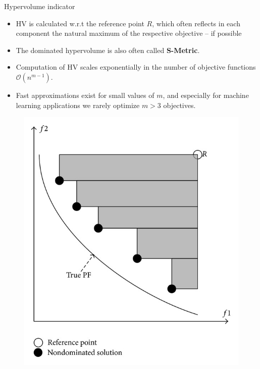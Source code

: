 \documentclass[11pt,compress,t,notes=noshow, xcolor=table]{beamer}
\begin{document}
\begin{vbframe}{Hypervolume indicator}
\vspace{0.4cm}
\begin{minipage}[t]{0.65\textwidth}
\footnotesize
\begin{itemize}
            \item HV is calculated w.r.t the reference point $R$, which often reflects in each component the natural maximum of the respective objective -- if possible
            \item The dominated hypervolume is also often called \textbf{S-Metric}.
            \item Computation of HV scales exponentially in the number of objective functions $\mathcal{O}(n^{m-1})$.
            \item Fast approximations exist for small values of $m$, and especially for machine learning applications we rarely optimize $m > 3$ objectives.
    \end{itemize}
\end{minipage}
\begin{minipage}[t]{0.3\textwidth}
\begin{figure}
\includegraphics[width = 1\linewidth]{figure_man/dominated_hypervolume.png}
\end{figure}
\end{minipage}




\end{vbframe}

\endlecture
\end{document}
